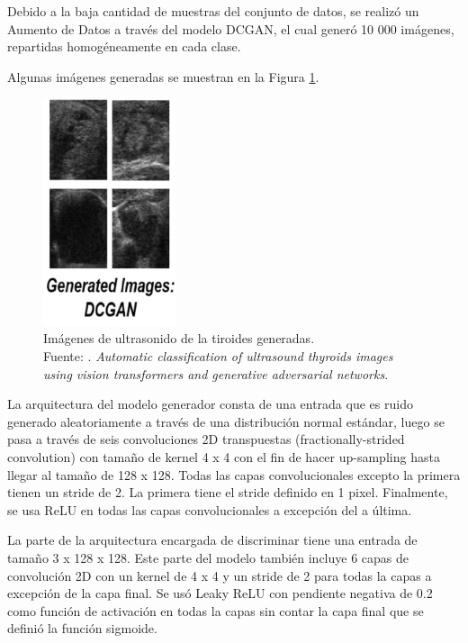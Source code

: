 Debido a la baja cantidad de muestras del conjunto de datos, se realizó un Aumento de Datos a través del modelo DCGAN, el cual generó 10 000 imágenes, repartidas homogéneamente en cada clase.

Algunas imágenes generadas se muestran en la Figura \ref{2:fig122}.

\begin{figure}[H]
	\begin{center}
		\includegraphics[width=0.35\textwidth]{2/figures/vitpaper6_part1.png}
		\caption[Imágenes de ultrasonido de la tiroides generadas]{Imágenes de ultrasonido de la tiroides generadas. \\
		Fuente: \cite{pr_JERBI2023autoclassViTGAN}. \textit{Automatic classification of ultrasound thyroids images using vision transformers and generative adversarial networks}.}
		\label{2:fig122}
	\end{center}
\end{figure}

La arquitectura del modelo generador consta de una entrada que es ruido generado aleatoriamente a través de una distribución normal estándar, luego se pasa a través de seis convoluciones 2D transpuestas (fractionally-strided convolution) con tamaño de kernel 4 x 4 con el fin de hacer up-sampling hasta llegar al tamaño de 128 x 128. Todas las capas convolucionales excepto la primera tienen un stride de 2. La primera tiene el stride definido en 1 pixel. Finalmente, se usa ReLU en todas las capas convolucionales a excepción del a última. 

La parte de la arquitectura encargada de discriminar tiene una entrada de tamaño 3 x 128 x 128. Este parte del modelo también incluye 6 capas de convolución 2D con un kernel de 4 x 4 y un stride de 2 para todas la capas a excepción de la capa final. Se usó Leaky ReLU con pendiente negativa de 0.2 como función de activación en todas la capas sin contar la capa final que se definió la función sigmoide.

